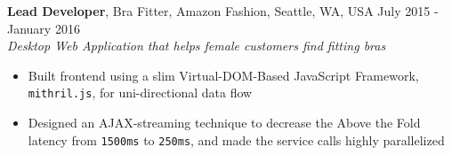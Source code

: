 \documentclass[line]{res} %
\begin{document}
\begin{resume}
    \textbf{Lead Developer}, Bra Fitter, Amazon Fashion, Seattle, WA, USA
    \hfill July 2015 - January 2016 \\
    \textit{Desktop Web Application that helps female customers find fitting bras}
    \begin{itemize} \itemsep -2pt  %
      \item Built frontend using a slim Virtual-DOM-Based JavaScript Framework,
            \texttt{mithril.js}, for uni-directional data flow
      \item Designed an AJAX-streaming technique to decrease the Above the Fold latency from \texttt{1500ms} to
            \texttt{250ms}, and made the service calls highly parallelized
		\end{itemize}



\end{resume}
\end{document}
